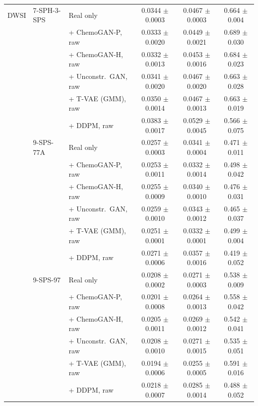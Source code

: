\begin{tabular}{lllccc}
\hline
DWSI & 7-SPH-3-SPS & Real only & 0.0344 $\pm$ 0.0003 & 0.0467 $\pm$ 0.0003 & 0.664 $\pm$ 0.004 \\
 &  & + ChemoGAN-P, raw & 0.0333 $\pm$ 0.0020 & 0.0449 $\pm$ 0.0021 & 0.689 $\pm$ 0.030 \\
 &  & + ChemoGAN-H, raw & 0.0332 $\pm$ 0.0013 & 0.0453 $\pm$ 0.0016 & 0.684 $\pm$ 0.023 \\
 &  & + Unconstr.\ GAN, raw & 0.0341 $\pm$ 0.0020 & 0.0467 $\pm$ 0.0020 & 0.663 $\pm$ 0.028 \\
 &  & + T-VAE (GMM), raw & 0.0350 $\pm$ 0.0014 & 0.0467 $\pm$ 0.0013 & 0.663 $\pm$ 0.019 \\
 &  & + DDPM, raw & 0.0383 $\pm$ 0.0017 & 0.0529 $\pm$ 0.0045 & 0.566 $\pm$ 0.075 \\
\hline
 & 9-SPS-77A & Real only & 0.0257 $\pm$ 0.0003 & 0.0341 $\pm$ 0.0004 & 0.471 $\pm$ 0.011 \\
 &  & + ChemoGAN-P, raw & 0.0253 $\pm$ 0.0011 & 0.0332 $\pm$ 0.0014 & 0.498 $\pm$ 0.042 \\
 &  & + ChemoGAN-H, raw & 0.0255 $\pm$ 0.0009 & 0.0340 $\pm$ 0.0010 & 0.476 $\pm$ 0.031 \\
 &  & + Unconstr.\ GAN, raw & 0.0259 $\pm$ 0.0010 & 0.0343 $\pm$ 0.0012 & 0.465 $\pm$ 0.037 \\
 &  & + T-VAE (GMM), raw & 0.0251 $\pm$ 0.0001 & 0.0332 $\pm$ 0.0001 & 0.499 $\pm$ 0.004 \\
 &  & + DDPM, raw & 0.0271 $\pm$ 0.0006 & 0.0357 $\pm$ 0.0016 & 0.419 $\pm$ 0.052 \\
\hline
 & 9-SPS-97 & Real only & 0.0208 $\pm$ 0.0002 & 0.0271 $\pm$ 0.0003 & 0.538 $\pm$ 0.009 \\
 &  & + ChemoGAN-P, raw & 0.0201 $\pm$ 0.0008 & 0.0264 $\pm$ 0.0013 & 0.558 $\pm$ 0.042 \\
 &  & + ChemoGAN-H, raw & 0.0205 $\pm$ 0.0011 & 0.0269 $\pm$ 0.0012 & 0.542 $\pm$ 0.041 \\
 &  & + Unconstr.\ GAN, raw & 0.0208 $\pm$ 0.0010 & 0.0271 $\pm$ 0.0015 & 0.535 $\pm$ 0.051 \\
 &  & + T-VAE (GMM), raw & 0.0194 $\pm$ 0.0006 & 0.0255 $\pm$ 0.0005 & 0.591 $\pm$ 0.016 \\
 &  & + DDPM, raw & 0.0218 $\pm$ 0.0007 & 0.0285 $\pm$ 0.0014 & 0.488 $\pm$ 0.052 \\
\hline
\end{tabular}